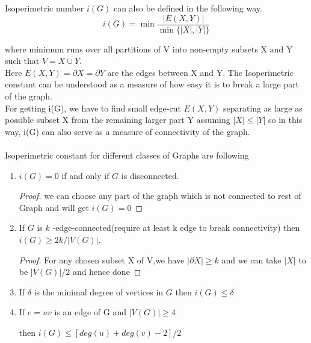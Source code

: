 \documentclass[oneside]{book}
\begin{document}
Isoperimetric number	$i(G)$ can also be defined in the following way. 
$$
		i(G)=\min \frac{|E(X, Y)|}{\min \{|X|,|Y|\}}
	$$
    
	where minimum runs over all partitions of V into non-empty subsets X and Y such that  $V=X \cup Y$.\\
	 Here $E(X, Y)=\partial X=\partial Y$ are the edges between X and Y.
	\hfill \break
		\hfill \break
	The Isoperimetric constant can be understood as a measure of how easy
	it is to break a large part of the graph. \\
	  
	For getting i(G), we have to find small edge-cut $E(X, Y)$ separating as large as possible subset X from the remaining larger part Y assuming $|X|\leq |Y|$ so in this way, i(G) can also serve as a measure of connectivity of the graph. \\\\
	Isoperimetric constant for different classes of Graphs are following \par
	\begin{enumerate}
		 
		\item  $i(G)=0$ if and only if $G$ is disconnected. \par
		\begin{proof}
			we can choose  any part of the graph which is not connected to rest of Graph and will get $i(G)=0$
		\end{proof} \par
		\item  If $G$ is $k$ -edge-connected(require at least k edge to break connectivity) then $i(G) \geq 2 k /|V(G)|$. \par
		\begin{proof}
			
			For any chosen subset X of V,we have  $|\partial X| \geq k$ and we can take $|X|$ to be $|V(G)|/2$ and hence done 
		\end{proof}
		\item  If $\delta$ is the minimal degree of vertices in $G$ then $i(G) \leq\delta$ \par
		\item  If   $e=u v$ is   an  edge  of G  and $|V(G)| \geq 4$ \par then  $i(G) \leq [deg(u)+deg(v)-2] / 2$ \par
	\end{enumerate}
	
	
	
\end{document}
